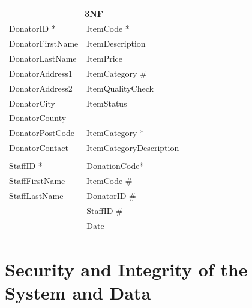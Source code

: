 \begin{center}
\begin{tabular}{|p{4.5cm}|p{4.5cm}|}
\hline
\multicolumn{2}{|c|}{3NF}                                                             \\ \hline
\multicolumn{1}{|l|}{DonatorID *}      & \multicolumn{1}{l|}{ItemCode *}              \\
\multicolumn{1}{|l|}{DonatorFirstName} & \multicolumn{1}{l|}{ItemDescription}         \\
\multicolumn{1}{|l|}{DonatorLastName}  & \multicolumn{1}{l|}{ItemPrice}               \\
\multicolumn{1}{|l|}{DonatorAddress1}  & \multicolumn{1}{l|}{ItemCategory \#}         \\
\multicolumn{1}{|l|}{DonatorAddress2}  & \multicolumn{1}{l|}{ItemQualityCheck}        \\
\multicolumn{1}{|l|}{DonatorCity}      & \multicolumn{1}{l|}{ItemStatus}              \\ \cline{2-2} 
\multicolumn{1}{|l|}{DonatorCounty}    &                                              \\ \cline{2-2} 
\multicolumn{1}{|l|}{DonatorPostCode}  & \multicolumn{1}{l|}{ItemCategory *}          \\
\multicolumn{1}{|l|}{DonatorContact}   & \multicolumn{1}{l|}{ItemCategoryDescription} \\ \hline
                                       &                                              \\ \hline
\multicolumn{1}{|l|}{StaffID *}        & \multicolumn{1}{l|}{DonationCode*}           \\
\multicolumn{1}{|l|}{StaffFirstName}   & \multicolumn{1}{l|}{ItemCode \#}             \\
\multicolumn{1}{|l|}{StaffLastName}    & \multicolumn{1}{l|}{DonatorID \#}            \\ \cline{1-1}
\multicolumn{1}{l|}{}                  & \multicolumn{1}{l|}{StaffID \#}              \\
\multicolumn{1}{l|}{}                  & \multicolumn{1}{l|}{Date}                    \\ \cline{2-2} 
\end{tabular}
\end{center}

\section{Security and Integrity of the System and Data}

